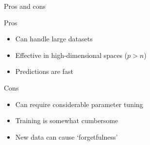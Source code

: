 \begin{frame}{Pros and cons}
    \begin{block}{Pros}
        \begin{itemize}
            \item Can handle large datasets
            \item Effective in high\hyp{}dimensional spaces ($p > n$)
            \item Predictions are fast
        \end{itemize}
    \end{block}
    \vfill
    \begin{block}{Cons}
        \begin{itemize}
            \item Can require considerable parameter tuning
            \item Training is somewhat cumbersome
            \item New data can cause `forgetfulness'
        \end{itemize}
    \end{block}
\end{frame}



